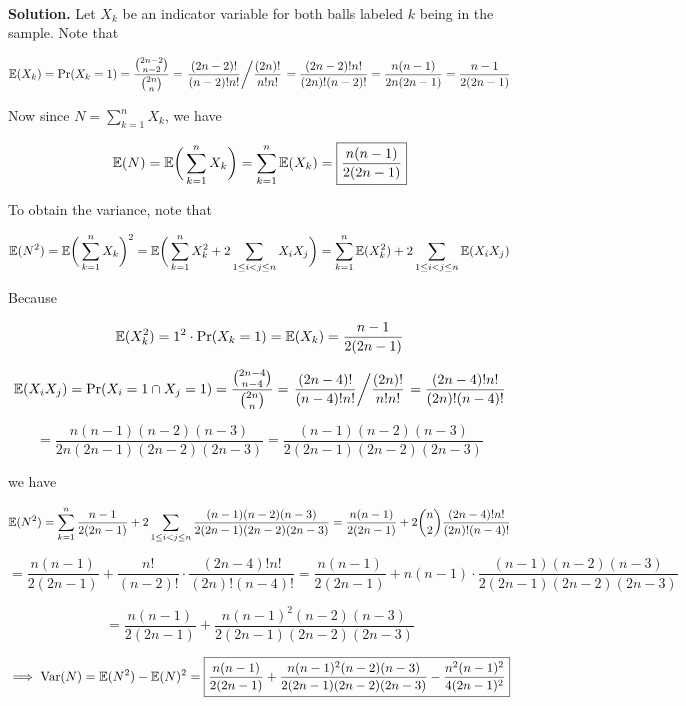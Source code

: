 \



\textbf{Solution.}  Let \(X_k\) be an indicator variable for both balls labeled \(k\) being in the sample. Note that

\[
\E(X_k) = \Pr(X_k = 1) = \frac{\binom{2n-2}{n-2}}{\binom{2n}{n}} = \left. \frac{(2n-2)!}{(n-2)!n!} \middle/ \frac{(2n)!}{n!n!}  \right. = \frac{(2n-2)!n!}{(2n)!(n-2)!} = \frac{n(n-1)}{2n(2n-1)} = \frac{n-1}{2(2n-1)}
\]

Now since \(N = \sum_{k=1}^n X_k\), we have

\[
\E(N) = \E \bigg( \sum_{k=1}^n X_k \bigg) = \sum_{k=1}^n \E(X_k) = \boxed{\frac{n(n-1)}{2(2n-1)} }
\]

To obtain the variance, note that

\[
\E(N^2) = \E \bigg( \sum_{k=1}^n X_k \bigg)^2 =  \E \bigg( \sum_{k=1}^n X_k^2 + 2\sum_{1 \leq i < j \leq n} X_i X_j \bigg)  = \sum_{k=1}^n \E(X_k^2)   + 2\sum_{1 \leq i < j \leq n} \E(X_i X_j)
\]

Because

\[
\E(X_k^2) = 1^2 \cdot \Pr(X_k = 1) = \E(X_k) = \frac{n-1}{2(2n-1)}
\]

\[
\E(X_i X_j) = \Pr(X_i = 1 \cap X_j = 1) = \frac{\binom{2n-4}{n-4}}{\binom{2n}{n}} = \left. \frac{(2n-4)!}{(n-4)!n!} \middle/ \frac{(2n)!}{n!n!}  \right. = \frac{(2n-4)!n!}{(2n)!(n-4)!} 
\]

\[
= \frac{n(n-1)(n-2)(n-3)}{2n(2n-1)(2n-2)(2n-3)} = \frac{(n-1)(n-2)(n-3)}{2(2n-1)(2n-2)(2n-3)}
\]

we have

\[
\E(N^2) = \sum_{k=1}^n  \frac{n-1}{2(2n-1)}  + 2\sum_{1 \leq i < j \leq n} \frac{(n-1)(n-2)(n-3)}{2(2n-1)(2n-2)(2n-3)} =  \frac{n(n-1)}{2(2n-1)} + 2 \binom{n}{2} \frac{(2n-4)!n!}{(2n)!(n-4)!}  
\]

\[
=\frac{n(n-1)}{2(2n-1)} + \frac{n!}{(n-2)!} \cdot \frac{(2n-4)!n!}{(2n)!(n-4)!} = \frac{n(n-1)}{2(2n-1)} + n(n-1) \cdot  \frac{(n-1)(n-2)(n-3)}{2(2n-1)(2n-2)(2n-3)}
\]

\[
 = \frac{n(n-1)}{2(2n-1)} + \frac{n(n-1)^2(n-2)(n-3)}{2(2n-1)(2n-2)(2n-3)}
\]

\[
\implies \Var(N) = \E(N^2) - \E(N)^2 = \boxed{ \frac{n(n-1)}{2(2n-1)} +  \frac{n(n-1)^2(n-2)(n-3)}{2(2n-1)(2n-2)(2n-3)} - \frac{n^2(n-1)^2}{4(2n-1)^2}}
\]



